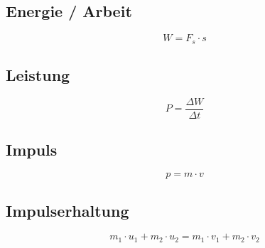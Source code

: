 \subsection{Energie / Arbeit}
\begin{equation}\label{eq:mechanik:energie}
 W = F_s \cdot s
\end{equation}

\subsection{Leistung}
\begin{equation}\label{eq:mechanik:leistung}
 P = \frac{\Delta W}{\Delta t}
\end{equation}

\subsection{Impuls}
\begin{equation}\label{eq:mechanik:impuls}
 p = m \cdot v
\end{equation}

\subsection{Impulserhaltung}
\begin{equation}\label{eq:mechanik:impulserhaltung}
 m_1 \cdot u_1 + m_2 \cdot u_2 = m_1 \cdot v_1 + m_2 \cdot v_2 
\end{equation}